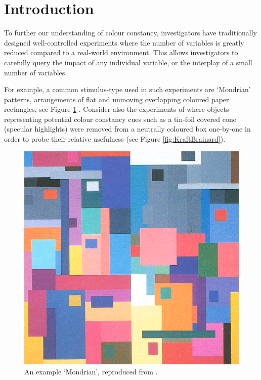 \newpage

\section{Introduction}

To further our understanding of colour constancy, investigators have traditionally designed well-controlled experiments where the number of variables is greatly reduced compared to a real-world environment. This allows investigators to carefully query the impact of any individual variable, or the interplay of a small number of variables. 

For example, a common stimulus-type used in such experiments are `Mondrian' patterns, arrangements of flat and unmoving overlapping coloured paper rectangles, see Figure \ref{fig:mondrian} \citep{hurlbert_colour_1999}. Consider also the experiments of \citet{kraft_mechanisms_1999} where objects representing potential colour constancy cues such as a tin-foil covered cone (specular highlights) were removed from a neutrally coloured box one-by-one in order to probe their relative usefulness (see Figure \ref{fig:KraftBrainard}).

\begin{figure}[htbp]
\includegraphics[max width=\textwidth]{figs/tablet/mondrian.png}
\caption{An example `Mondrian', reproduced from \citet{land_recent_1986}.}
\label{fig:mondrian}
\end{figure}

